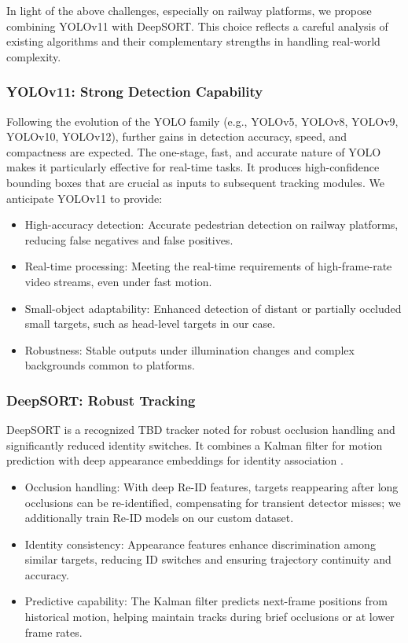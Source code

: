 In light of the above challenges, especially on railway platforms, we propose combining YOLOv11 with DeepSORT. This choice reflects a careful analysis of existing algorithms and their complementary strengths in handling real-world complexity.

\subsubsection{YOLOv11: Strong Detection Capability}
Following the evolution of the YOLO family (e.g., YOLOv5, YOLOv8, YOLOv9, YOLOv10, YOLOv12), further gains in detection accuracy, speed, and compactness are expected. The one-stage, fast, and accurate nature of YOLO makes it particularly effective for real-time tasks. It produces high-confidence bounding boxes that are crucial as inputs to subsequent tracking modules. We anticipate YOLOv11 to provide:
\begin{itemize}
    \item High-accuracy detection: Accurate pedestrian detection on railway platforms, reducing false negatives and false positives.
    \item Real-time processing: Meeting the real-time requirements of high-frame-rate video streams, even under fast motion.
    \item Small-object adaptability: Enhanced detection of distant or partially occluded small targets, such as head-level targets in our case.
    \item Robustness: Stable outputs under illumination changes and complex backgrounds common to platforms.
\end{itemize}

\subsubsection{DeepSORT: Robust Tracking}
DeepSORT is a recognized TBD tracker noted for robust occlusion handling and significantly reduced identity switches. It combines a Kalman filter for motion prediction with deep appearance embeddings for identity association \cite{174}.
\begin{itemize}
    \item Occlusion handling: With deep Re-ID features, targets reappearing after long occlusions can be re-identified, compensating for transient detector misses; we additionally train Re-ID models on our custom dataset.
    \item Identity consistency: Appearance features enhance discrimination among similar targets, reducing ID switches and ensuring trajectory continuity and accuracy.
    \item Predictive capability: The Kalman filter predicts next-frame positions from historical motion, helping maintain tracks during brief occlusions or at lower frame rates.
\end{itemize}

